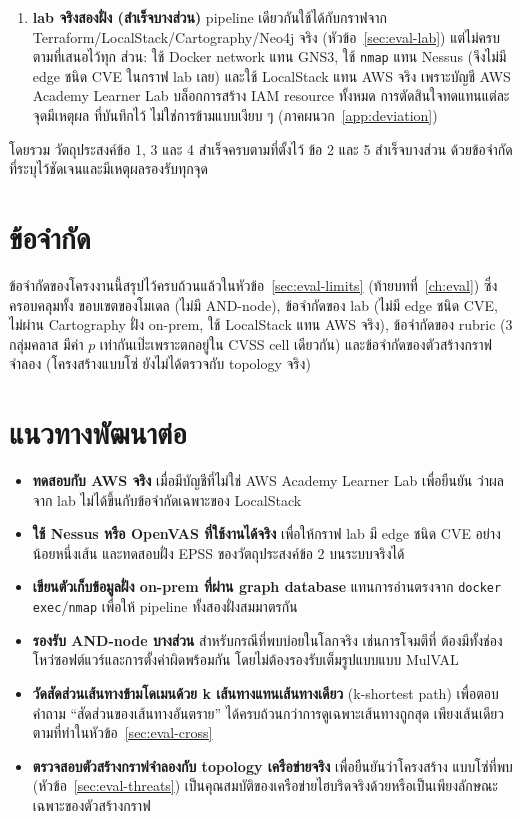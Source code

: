 \begin{enumerate}[leftmargin=1.6em]
\item \textbf{lab จริงสองฝั่ง (สำเร็จบางส่วน)} pipeline เดียวกันใช้ได้กับกราฟจาก
Terraform/LocalStack/Cartography/Neo4j จริง (หัวข้อ~\ref{sec:eval-lab}) แต่ไม่ครบตามที่เสนอไว้ทุก
ส่วน: ใช้ Docker network แทน GNS3, ใช้ \texttt{nmap} แทน Nessus (จึงไม่มี edge ชนิด
CVE ในกราฟ lab เลย) และใช้ LocalStack แทน AWS จริง เพราะบัญชี AWS Academy
Learner Lab บล็อกการสร้าง IAM resource ทั้งหมด การตัดสินใจทดแทนแต่ละจุดมีเหตุผล
ที่บันทึกไว้ ไม่ใช่การข้ามแบบเงียบ ๆ (ภาคผนวก~\ref{app:deviation})

\end{enumerate}

โดยรวม วัตถุประสงค์ข้อ 1, 3 และ 4 สำเร็จครบตามที่ตั้งไว้ ข้อ 2 และ 5 สำเร็จบางส่วน
ด้วยข้อจำกัดที่ระบุไว้ชัดเจนและมีเหตุผลรองรับทุกจุด

\section{ข้อจำกัด}\label{sec:concl-limits}

ข้อจำกัดของโครงงานนี้สรุปไว้ครบถ้วนแล้วในหัวข้อ~\ref{sec:eval-limits} (ท้ายบทที่~\ref{ch:eval}) ซึ่งครอบคลุมทั้ง
ขอบเขตของโมเดล (ไม่มี AND-node), ข้อจำกัดของ lab (ไม่มี edge ชนิด CVE, ไม่ผ่าน
Cartography ฝั่ง on-prem, ใช้ LocalStack แทน AWS จริง), ข้อจำกัดของ rubric (3 กลุ่มคลาส
มีค่า $p$ เท่ากันเป๊ะเพราะตกอยู่ใน CVSS cell เดียวกัน) และข้อจำกัดของตัวสร้างกราฟ
จำลอง (โครงสร้างแบบโซ่ ยังไม่ได้ตรวจกับ topology จริง)

\section{แนวทางพัฒนาต่อ}\label{sec:concl-future}

\begin{itemize}[leftmargin=1.6em]
\item \textbf{ทดสอบกับ AWS จริง} เมื่อมีบัญชีที่ไม่ใช่ AWS Academy Learner Lab เพื่อยืนยัน
ว่าผลจาก lab ไม่ได้ขึ้นกับข้อจำกัดเฉพาะของ LocalStack
\item \textbf{ใช้ Nessus หรือ OpenVAS ที่ใช้งานได้จริง} เพื่อให้กราฟ lab มี edge ชนิด CVE
อย่างน้อยหนึ่งเส้น และทดสอบฝั่ง EPSS ของวัตถุประสงค์ข้อ 2 บนระบบจริงได้
\item \textbf{เขียนตัวเก็บข้อมูลฝั่ง on-prem ที่ผ่าน graph database} แทนการอ่านตรงจาก
\texttt{docker exec}/\texttt{nmap} เพื่อให้ pipeline ทั้งสองฝั่งสมมาตรกัน
\item \textbf{รองรับ AND-node บางส่วน} สำหรับกรณีที่พบบ่อยในโลกจริง เช่นการโจมตีที่
ต้องมีทั้งช่องโหว่ซอฟต์แวร์และการตั้งค่าผิดพร้อมกัน โดยไม่ต้องรองรับเต็มรูปแบบแบบ MulVAL
\item \textbf{วัดสัดส่วนเส้นทางข้ามโดเมนด้วย k เส้นทางแทนเส้นทางเดียว} (k-shortest path)
เพื่อตอบคำถาม ``สัดส่วนของเส้นทางอันตราย'' ได้ครบถ้วนกว่าการดูเฉพาะเส้นทางถูกสุด
เพียงเส้นเดียวตามที่ทำในหัวข้อ~\ref{sec:eval-cross}
\item \textbf{ตรวจสอบตัวสร้างกราฟจำลองกับ topology เครือข่ายจริง} เพื่อยืนยันว่าโครงสร้าง
แบบโซ่ที่พบ (หัวข้อ~\ref{sec:eval-threats}) เป็นคุณสมบัติของเครือข่ายไฮบริดจริงด้วยหรือเป็นเพียงลักษณะ
เฉพาะของตัวสร้างกราฟ
\end{itemize}
